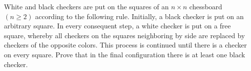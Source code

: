 White and black checkers are put on the squares of an $n\times n$ chessboard $(n\ge2)$ according to the following rule. Initially, a black checker is put on an arbitrary square. In every consequent step, a white checker is put on a free square, whereby all checkers on the squares neighboring by side are replaced by checkers of the opposite colors. This process is continued until there is a checker on every square. Prove that in the final configuration there is at least one black checker.